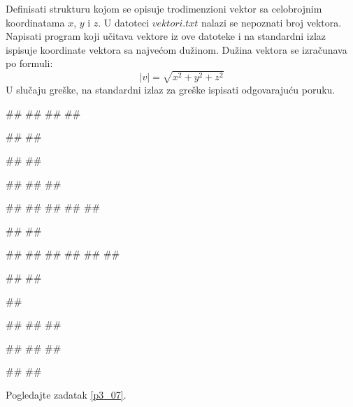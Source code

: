 \begin{Exercise}[label=p3_x5]         
Definisati strukturu kojom se opisuje trodimenzioni vektor sa celobrojnim koordinatama $x$, $y$ i $z$.
U datoteci $vektori.txt$ nalazi se nepoznati broj vektora. 
Napisati program koji učitava vektore iz ove datoteke i na standardni izlaz ispisuje 
koordinate vektora sa najvećom dužinom. 
Dužina vektora se izračunava po formuli:
$$|v|= \sqrt{x^2+y^2+z^2}$$
U slučaju greške, na standardni izlaz za greške ispisati odgovarajuću poruku.

\begin{minitest}
\begin{upotreba}{1}
##
##
##
##

#\naslovIzlaz#
##
\end{upotreba}
\end{minitest}
\begin{minitest}
\begin{upotreba}{2}
##
##

#\naslovIzlazZaGresku#
##
##
\end{upotreba}
\end{minitest}
\begin{minitest}
\begin{upotreba}{3}
##
##
##
##
##

#\naslovIzlaz#
##
\end{upotreba}
\end{minitest}

\begin{minitest}
\begin{upotreba}{4}
##
##
##
##
##
##

#\naslovIzlaz#
##
\end{upotreba}
\end{minitest}
\begin{minitest}
\begin{upotreba}{5}
##

#\naslovIzlazZaGresku#
##
##
\end{upotreba}
\end{minitest}
\begin{minitest}
\begin{upotreba}{6}
##
##
##

#\naslovIzlaz#
##
\end{upotreba}
\end{minitest}
\end{Exercise}
\begin{Answer}[ref=p3_x5]
 
Pogledajte zadatak \ref{p3_07}.
\end{Answer}


